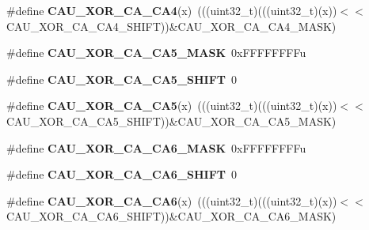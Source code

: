 \begin{DoxyCompactItemize}
\item 
\#define {\bfseries C\+A\+U\+\_\+\+X\+O\+R\+\_\+\+C\+A\+\_\+\+C\+A4}(x)~(((uint32\+\_\+t)(((uint32\+\_\+t)(x))$<$$<$C\+A\+U\+\_\+\+X\+O\+R\+\_\+\+C\+A\+\_\+\+C\+A4\+\_\+\+S\+H\+I\+FT))\&C\+A\+U\+\_\+\+X\+O\+R\+\_\+\+C\+A\+\_\+\+C\+A4\+\_\+\+M\+A\+SK)\hypertarget{group__CAU__Register__Masks_ga76d51795ea5635a4804f5b7ef4e4155c}{}\label{group__CAU__Register__Masks_ga76d51795ea5635a4804f5b7ef4e4155c}

\item 
\#define {\bfseries C\+A\+U\+\_\+\+X\+O\+R\+\_\+\+C\+A\+\_\+\+C\+A5\+\_\+\+M\+A\+SK}~0x\+F\+F\+F\+F\+F\+F\+F\+Fu\hypertarget{group__CAU__Register__Masks_ga74cbc0141ce46b620019e18b8eb2f908}{}\label{group__CAU__Register__Masks_ga74cbc0141ce46b620019e18b8eb2f908}

\item 
\#define {\bfseries C\+A\+U\+\_\+\+X\+O\+R\+\_\+\+C\+A\+\_\+\+C\+A5\+\_\+\+S\+H\+I\+FT}~0\hypertarget{group__CAU__Register__Masks_ga524e70cc275f9e2d963db75ea6dace92}{}\label{group__CAU__Register__Masks_ga524e70cc275f9e2d963db75ea6dace92}

\item 
\#define {\bfseries C\+A\+U\+\_\+\+X\+O\+R\+\_\+\+C\+A\+\_\+\+C\+A5}(x)~(((uint32\+\_\+t)(((uint32\+\_\+t)(x))$<$$<$C\+A\+U\+\_\+\+X\+O\+R\+\_\+\+C\+A\+\_\+\+C\+A5\+\_\+\+S\+H\+I\+FT))\&C\+A\+U\+\_\+\+X\+O\+R\+\_\+\+C\+A\+\_\+\+C\+A5\+\_\+\+M\+A\+SK)\hypertarget{group__CAU__Register__Masks_gaa6543e7a0b9ab892dc327821a6357973}{}\label{group__CAU__Register__Masks_gaa6543e7a0b9ab892dc327821a6357973}

\item 
\#define {\bfseries C\+A\+U\+\_\+\+X\+O\+R\+\_\+\+C\+A\+\_\+\+C\+A6\+\_\+\+M\+A\+SK}~0x\+F\+F\+F\+F\+F\+F\+F\+Fu\hypertarget{group__CAU__Register__Masks_ga6b422fcb6666aa9f5c25894082aa81d8}{}\label{group__CAU__Register__Masks_ga6b422fcb6666aa9f5c25894082aa81d8}

\item 
\#define {\bfseries C\+A\+U\+\_\+\+X\+O\+R\+\_\+\+C\+A\+\_\+\+C\+A6\+\_\+\+S\+H\+I\+FT}~0\hypertarget{group__CAU__Register__Masks_gadf7fdd8eaf9822fec5ac691246d95683}{}\label{group__CAU__Register__Masks_gadf7fdd8eaf9822fec5ac691246d95683}

\item 
\#define {\bfseries C\+A\+U\+\_\+\+X\+O\+R\+\_\+\+C\+A\+\_\+\+C\+A6}(x)~(((uint32\+\_\+t)(((uint32\+\_\+t)(x))$<$$<$C\+A\+U\+\_\+\+X\+O\+R\+\_\+\+C\+A\+\_\+\+C\+A6\+\_\+\+S\+H\+I\+FT))\&C\+A\+U\+\_\+\+X\+O\+R\+\_\+\+C\+A\+\_\+\+C\+A6\+\_\+\+M\+A\+SK)\hypertarget{group__CAU__Register__Masks_ga0caf44b77f17a23d0e941f9f5954a7fb}{}\label{group__CAU__Register__Masks_ga0caf44b77f17a23d0e941f9f5954a7fb}


\end{DoxyCompactItemize}
